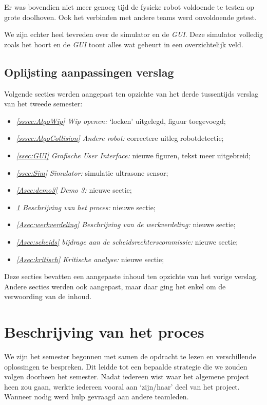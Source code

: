 \documentclass[eind]{penoverslag}
\begin{document}
Er was bovendien niet meer genoeg tijd de fysieke robot voldoende te testen op grote doolhoven. Ook het verbinden met andere teams werd onvoldoende getest.

We zijn echter heel tevreden over de simulator en de \textit{GUI}. Deze simulator volledig zoals het hoort en de \textit{GUI} toont alles wat gebeurt in een overzichtelijk veld.

\subsection{Oplijsting aanpassingen verslag}
\label{Assec:aanp3}
Volgende secties werden aangepast ten opzichte van het derde tussentijds verslag van het tweede semester:

\begin{itemize}
	\item \textit{\ref{sssec:AlgoWip} Wip openen:} `locken' uitgelegd, figuur toegevoegd;
	\item \textit{\ref{sssec:AlgoCollision} Andere robot:} correctere uitleg robotdetectie;
	\item \textit{\ref{ssec:GUI} Grafische User Interface:} nieuwe figuren, tekst meer uitgebreid;
	\item \textit{\ref{ssec:Sim} Simulator:} simulatie ultrasone sensor;
	\item \textit{\ref{Asec:demo3} Demo 3:} nieuwe sectie;
	\item \textit{\ref{Asec:beschrijvingProces} Beschrijving van het proces:} nieuwe sectie;
	\item \textit{\ref{Asec:werkverdeling} Beschrijving van de werkverdeling:} nieuwe sectie;
	\item \textit{\ref{Asec:scheids} bijdrage aan de scheidsrechterscommissie:} nieuwe sectie;
	\item \textit{\ref{Asec:kritisch} Kritische analyse:} nieuwe sectie;
\end{itemize}

Deze secties bevatten een aangepaste inhoud ten opzichte van het vorige verslag. Andere secties werden ook aangepast, maar daar ging het enkel om de verwoording van de inhoud.

\section{Beschrijving van het proces}
\label{Asec:beschrijvingProces}

We zijn het semester begonnen met samen de opdracht te lezen en verschillende oplossingen te bespreken. Dit leidde tot een bepaalde strategie \cite{Strategie} die we zouden volgen doorheen het semester. Nadat iedereen wist waar het algemene project heen zou gaan, werkte iedereen vooral aan `zijn/haar' deel van het project. Wanneer nodig werd hulp gevraagd aan andere teamleden.
\end{document}
